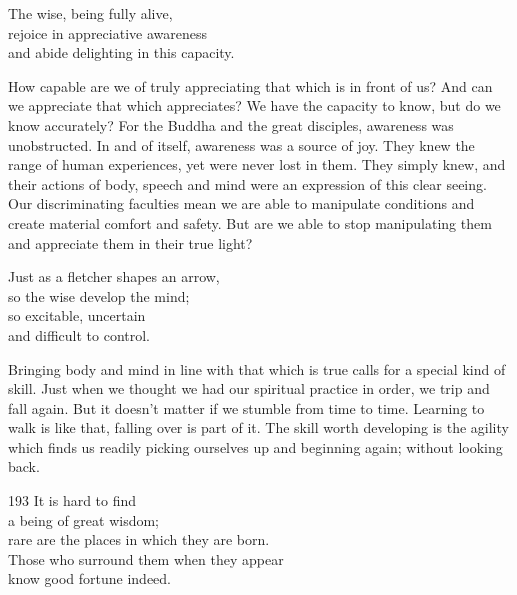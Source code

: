 
\begin{dhpVerse}{22}
\label{dhp-22}
The wise, being fully alive,\\
rejoice in appreciative awareness\\
and abide delighting in this capacity.
\end{dhpVerse}

\begin{dhpRefl}
  How capable are we of truly appreciating that which is in front of us? And can
  we appreciate that which appreciates? We have the capacity to know, but do we
  know accurately? For the Buddha and the great disciples, awareness was
  unobstructed. In and of itself, awareness was a source of joy. They knew the
  range of human experiences, yet were never lost in them. They simply knew, and
  their actions of body, speech and mind were an expression of this clear
  seeing. Our discriminating faculties mean we are able to manipulate conditions
  and create material comfort and safety. But are we able to stop manipulating
  them and appreciate them in their true light?
\end{dhpRefl}


\begin{dhpVerse}{33}
\label{dhp-33}
Just as a fletcher shapes an arrow,\\
so the wise develop the mind;\\
so excitable, uncertain\\
and difficult to control.
\end{dhpVerse}

\begin{dhpRefl}
  Bringing body and mind in line with that which is true calls for a special
  kind of skill. Just when we thought we had our spiritual practice in order, we
  trip and fall again. But it doesn’t matter if we stumble from time to time.
  Learning to walk is like that, falling over is part of it. The skill worth
  developing is the agility which finds us readily picking ourselves up and
  beginning again; without looking back.
\end{dhpRefl}


\begin{dhpVerse}{193}
\label{dhp-193}
It is hard to find\\
a being of great wisdom;\\
rare are the places in which they are born.\\
Those who surround them when they appear\\
know good fortune indeed. 
\end{dhpVerse}

